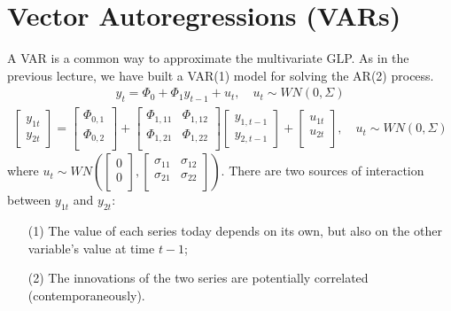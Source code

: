 \section{Vector Autoregressions (VARs)}\label{sec:VAR}
A VAR is a common way to approximate the multivariate GLP.
As in the previous lecture, we have built a VAR(1) model for solving the AR(2) process.
\begin{gather*}
    y_t = \Phi_0 + \Phi_1 y_{t-1} + u_t, \quad u_t \sim WN(0, \Sigma)
\end{gather*}
\begin{gather*}
    \begin{bmatrix}
        y_{1t} \\
        y_{2t}
    \end{bmatrix} = \begin{bmatrix}
         \Phi_{0,1} \\
         \Phi_{0,2} \\
    \end{bmatrix} + \begin{bmatrix}
        \Phi_{1,11} & \Phi_{1,12}  \\
        \Phi_{1,21} & \Phi_{1,22}  \\
    \end{bmatrix}
    \begin{bmatrix}
        y_{1,t-1} \\
        y_{2,t-1}
    \end{bmatrix} + \begin{bmatrix}
         u_{1t} \\
         u_{2t} \\
    \end{bmatrix}, \quad u_t \sim WN(0, \Sigma)
\end{gather*}
where $u_t \sim  WN\left( \begin{bmatrix}
     0 \\
     0 \\
\end{bmatrix}, \begin{bmatrix}
    \sigma_{11} & \sigma_{12} \\
    \sigma_{21} & \sigma_{22} \\
\end{bmatrix} \right)$.
There are two sources of interaction between $y_{1t}$ and $y_{2t}$:
\begin{enumerate}
    \item[(1)] The value of each series today depends on its own, but also on the other variable's value at time $t-1$;
    \item[(2)] The innovations of the two series are potentially correlated (contemporaneously).
\end{enumerate}
